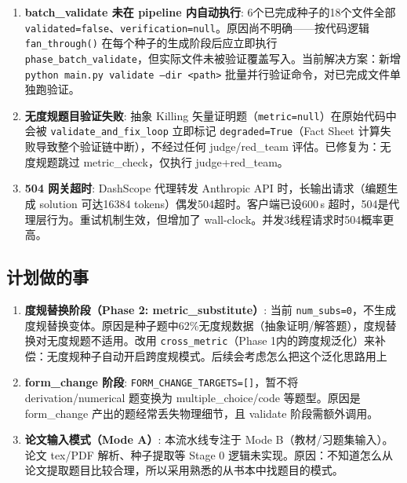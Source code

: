 \documentclass[11pt,a4paper]{article}
\begin{document}
\begin{enumerate}[nosep]
  \item \textbf{batch\_validate 未在 pipeline 内自动执行}: 6个已完成种子的18个文件全部 \texttt{validated=false}、\texttt{verification=null}。原因尚不明确——按代码逻辑 \texttt{fan\_through()} 在每个种子的生成阶段后应立即执行 \texttt{phase\_batch\_validate}，但实际文件未被验证覆盖写入。当前解决方案：新增 \texttt{python main.py validate --dir <path>} 批量并行验证命令，对已完成文件单独跑验证。

  \item \textbf{无度规题目验证失败}: 抽象 Killing 矢量证明题（\texttt{metric=null}）在原始代码中会被 \texttt{validate\_and\_fix\_loop} 立即标记 \texttt{degraded=True}（Fact Sheet 计算失败导致整个验证链中断），不经过任何 judge/red\_team 评估。已修复为：无度规题跳过 metric\_check，仅执行 judge+red\_team。

  \item \textbf{504 网关超时}: DashScope 代理转发 Anthropic API 时，长输出请求（编题生成 solution 可达16384 tokens）偶发504超时。客户端已设600\,s 超时，504是代理层行为。重试机制生效，但增加了 wall-clock。并发3线程请求时504概率更高。
\end{enumerate}

\subsection{计划做的事}

\begin{enumerate}[nosep]
  \item \textbf{度规替换阶段（Phase 2: metric\_substitute）}: 当前 \texttt{num\_subs=0}，不生成度规替换变体。原因是种子题中62\%无度规数据（抽象证明/解答题），度规替换对无度规题不适用。改用 \texttt{cross\_metric}（Phase 1内的跨度规泛化）来补偿：无度规种子自动开启跨度规模式。后续会考虑怎么把这个泛化思路用上

  \item \textbf{form\_change 阶段}: \texttt{FORM\_CHANGE\_TARGETS=[]}，暂不将 derivation/numerical 题变换为 multiple\_choice/code 等题型。原因是 form\_change 产出的题经常丢失物理细节，且 validate 阶段需额外调用。

  \item \textbf{论文输入模式（Mode A）}: 本流水线专注于 Mode B（教材/习题集输入）。论文 tex/PDF 解析、种子提取等 Stage 0 逻辑未实现。原因：不知道怎么从论文提取题目比较合理，所以采用熟悉的从书本中找题目的模式。
\end{enumerate}
\end{document}

